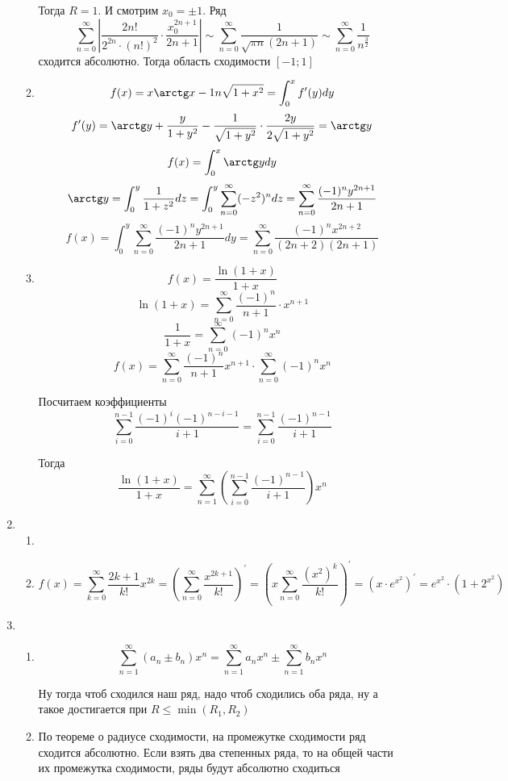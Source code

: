 \documentclass[11pt]{article}
\begin{document}
\begin{enumerate}
\begin{enumerate}
		Тогда $R=1$. И смотрим $ x_0=\pm 1$. Ряд $$ \sum_{n=0}^{\infty} \left| \frac{2n!}{2^{2n}\cdot (n!)^2}\cdot \frac{x_0^{2n+1}}{2n+1} \right|\sim \sum_{n=0}^{\infty} \frac{1}{\sqrt{\pi n}(2n+1)}\sim \sum_{n=0}^{\infty} \frac{1}{n^{\frac{3}{2}}}$$ сходится абсолютно. Тогда область сходимости $\left[-1;1\right]$
		\item $$ f(x) = x \arctg x - 1 n \sqrt{1+x^2} = \int_{0}^{x} f^\prime(y)dy $$
		$$ f^\prime(y) = \arctg y + \frac{y}{1+y^2}-\frac{1}{\sqrt{1+y^2}}\cdot \frac{2y}{2\sqrt{1+y^2}} = \arctg y$$
		$$ f(x ) = \int_{0}^{x} \arctg y dy$$
		$$ \arctg y = \int_{0}^{y}\frac{1}{1+z^2}dz = \int_{0}^{y} \sum_{n=0}^{\infty} (-z^2)^n dz = \sum_{n =0}^{\infty} \frac{(-1)^ny^{2n+1}}{2n+1} $$
		$$ f(x) = \int_{0}^{y}\sum_{n=0}^{\infty} \frac{(-1)^n y^{2n+1}}{2n+1}dy = \sum_{n=0}^{\infty} \frac{(-1)^n x^{2n+2}}{(2n+2)(2n+1)} $$
		\item $$ f(x) = \frac{\ln (1+x)}{1+x} $$
		$$ \ln (1+x) = \sum_{n=0}^{\infty} \frac{(-1)^n}{n+1}\cdot x^{n+1} $$
		$$ \frac{1}{1+x} = \sum_{n=0}^{\infty} (-1)^n x^n $$
		$$ f(x) = \sum_{n=0}^{\infty} \frac{(-1)^n}{n+1}x^{n+1}\cdot \sum_{n=0}^{\infty} (-1)^n x^n $$
		
		Посчитаем коэффициенты $$ \sum_{i=0}^{n-1} \frac{(-1)^i (-1)^{n-i-1}}{i+1} = \sum_{i=0}^{n-1} \frac{(-1)^{n-1}}{i+1} $$
		
		Тогда $$ \frac{\ln (1+x)}{1+x}  = \sum_{n=1}^{\infty}\left(\sum_{i=0}^{n-1} \frac{(-1)^{n-1}}{i+1}\right)x^n$$
	\end{enumerate}
	\item \begin{enumerate}
		\item 
		\item $$ f(x) = \sum_{k=0}^{\infty} \frac{2k+1}{k!}x^{2k}  = \left(\sum_{n=0}^{\infty} \frac{x^{2k+1}}{k!}\right)^\prime = \left(x\sum_{n=0}^{\infty} \frac{(x^2)^k}{k!}\right)^\prime = (x\cdot e^{x^2})^\prime = e^{x^2}\cdot (1+2^{x^2})$$
	\end{enumerate}
	\item \begin{enumerate}
		\item $$ \sum_{n = 1}^{\infty} (a_n\pm b_n)x^n = \sum_{n = 1}^{\infty} a_nx^n \pm \sum_{n = 1}^{\infty} b_nx^n$$
		
		Ну тогда чтоб сходился наш ряд, надо чтоб сходились оба ряда, ну а такое достигается при $R\le \min (R_1, R_2)$
		\item По теореме о радиусе сходимости, на промежутке сходимости ряд сходится абсолютно. Если взять два степенных ряда, то на общей части их промежутка сходимости, ряды будут абсолютно сходиться
	\end{enumerate}
	\end{enumerate}
\end{document}
